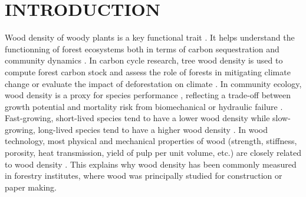\documentclass[a4paper, 12pt, leqno, dvipsnames]{article}\usepackage[]{graphicx}\usepackage[]{color}
\begin{document}
\newpage
\doublespacing

\section*{INTRODUCTION}


Wood density of woody plants is a key functional trait \citep{Violle2007, Chave2009}. It helps understand the functionning of forest ecosystems both in terms of carbon sequestration \citep{Chave2005, Vieilledent2012} and community dynamics \citep{Westoby2006, Kunstler2016, Diaz2016}. In carbon cycle research, tree wood density is used to compute forest carbon stock and assess the role of forests in mitigating climate change \citep{Pan2011, Vieilledent2016} or evaluate the impact of deforestation on climate \citep{Achard2014}. In community ecology, wood density is a proxy for species performance \citep{Lachenbruch2014}, reflecting a trade-off between growth potential and mortality risk from biomechanical or hydraulic failure \citep{Diaz2016}. Fast-growing, short-lived species tend to have a lower wood density while slow-growing, long-lived species tend to have a higher wood density \citep{Chave2009, Greenwood2017}. In wood technology, most physical and mechanical properties of wood (strength, stiffness, porosity, heat transmission, yield of pulp per unit volume, etc.) are closely related to wood density \citep{Sallenave1955, Thibaut2001, Shmulsky2011}. This explains why wood density has been commonly measured in forestry institutes, where wood was principally studied for construction or paper making.

\end{document}
